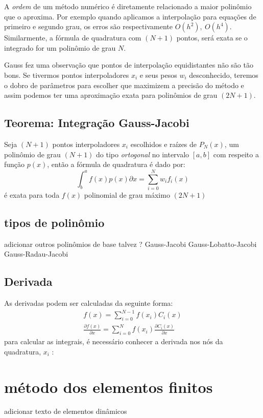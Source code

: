  A \emph{ordem} de um método numérico é diretamente relacionado a maior polinômio que o aproxima. Por exemplo quando aplicamos a interpolação para equações de primeiro e segundo grau, os erros são respectivamente $O(h^2),\ O(h^4)$. Similarmente, a fórmula de quadratura com $(N + 1)$ pontos, será exata se o integrado for um polinômio de grau $N$.
 
 Gauss fez uma observação que pontos de interpolação equidistantes não são tão bons. Se tivermos pontos interpoladores $x_i$ e seus pesos $w_i$ 
desconhecido, teremos o dobro de parâmetros para escolher que maximizem a precisão do método e assim podemos ter uma aproximação exata para polinômios de grau $(2N + 1)$.
\subsection{Teorema: Integração Gauss-Jacobi}
 Seja $(N + 1)$ pontos interpoladores $x_i$ escolhidos e raízes de $P_N(x)$, um polinômio de grau $(N+1)$ do tipo \emph{ortogonal} no intervalo $[a,b]$ com respeito a função $p(x)$, então a fórmula de quadratura é dado por:
\begin{equation}
 \int^a_b f(x)p(x) \partial x = \sum^{N}_{i= 0} w_i f_i(x)
\end{equation} 
é exata para toda $f(x)$ polinomial de grau máximo $(2N +1)$

\subsection{tipos de polinômio}
	adicionar outros polinômios de base talvez ?
	Gauss-Jacobi
	Gauss-Lobatto-Jacobi
	Gauss-Radau-Jacobi 


\subsection{Derivada}
	As derivadas podem ser calculadas da seguinte forma:
	\begin{align}
	f(x) = \sum^{N-1}_{i=0} f(x_i) C_i(x)\\
	\frac{\partial f(x)}{\partial x} = \sum^{N}_{i = 0} f(x_i) \frac{\partial C_i(x)}{\partial x}
	\end{align}
	para calcular as integrais, é necessário conhecer a derivada nos nós da quadratura, $x_i$ :

\section{método dos elementos finitos}
adicionar texto de elementos dinâmicos